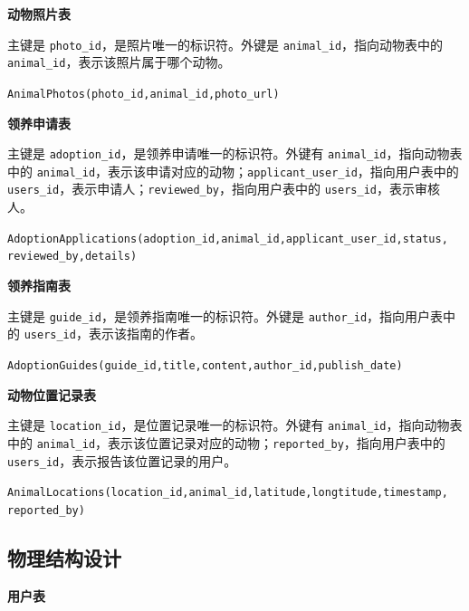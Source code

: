 \documentclass[12pt,a4paper,UTF8]{article}
\begin{document}
\vspace{0.25cm}

\noindent\textbf{动物照片表}

主键是 \verb|photo_id|，是照片唯一的标识符。外键是 \verb|animal_id|，指向动物表中的 \verb|animal_id|，表示该照片属于哪个动物。

\verb|AnimalPhotos(photo_id,animal_id,photo_url)|

\vspace{0.25cm}

\noindent\textbf{领养申请表}

主键是 \verb|adoption_id|，是领养申请唯一的标识符。外键有 \verb|animal_id|，指向动物表中的 \verb|animal_id|，表示该申请对应的动物；\verb|applicant_user_id|，指向用户表中的 \verb|users_id|，表示申请人；\verb|reviewed_by|，指向用户表中的 \verb|users_id|，表示审核人。

\verb|AdoptionApplications(adoption_id,animal_id,applicant_user_id,status,|\\ \verb|reviewed_by,details)|

\vspace{0.25cm}

\noindent\textbf{领养指南表}

主键是 \verb|guide_id|，是领养指南唯一的标识符。外键是 \verb|author_id|，指向用户表中的 \verb|users_id|，表示该指南的作者。

\verb|AdoptionGuides(guide_id,title,content,author_id,publish_date)|

\vspace{0.25cm}

\noindent\textbf{动物位置记录表}

主键是 \verb|location_id|，是位置记录唯一的标识符。外键有 \verb|animal_id|，指向动物表中的 \verb|animal_id|，表示该位置记录对应的动物；\verb|reported_by|，指向用户表中的 \verb|users_id|，表示报告该位置记录的用户。

\verb|AnimalLocations(location_id,animal_id,latitude,longtitude,timestamp,|\\ \verb|reported_by)|



\subsection{物理结构设计}

\noindent\textbf{用户表}
\end{document}
